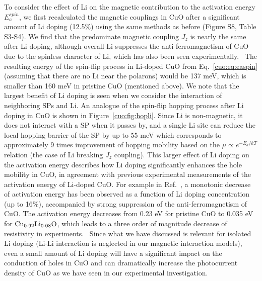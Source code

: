To consider the effect of Li on the magnetic contribution to the activation energy $E_a^{spin}$, we first recalculated the magnetic couplings in CuO after a significant amount of Li doping (12.5\%) using the same methods as before (Figure S8, Table S3-S4). We find that the predominate magnetic coupling $J_z$ is nearly the same after Li doping, although overall Li suppresses the anti-ferromagnetism of CuO due to the spinless character of Li, which has also been seen experimentally.~\cite{zheng2004fast} The resulting energy of the spin-flip process in Li-doped CuO from Eq.~\ref{cuo:eq:easpin} (assuming that there are no Li near the polarons) would be 137 meV, which is smaller than 160 meV in pristine CuO (mentioned above). We note that the largest benefit of Li doping is seen when we consider the interaction of neighboring SPs and Li. An analogue of the spin-flip hopping process after Li doping in CuO is shown in Figure~\ref{cuo:fig:hopli}. Since Li is non-magnetic, it does not interact with a SP when it passes by, and a single Li site can reduce the local hopping barrier of the SP by up to 55 meV which corresponds to approximately 9 times improvement of hopping mobility based on the $\mu \propto e^{-E_a/kT}$ relation (the case of Li breaking $J_z$ coupling). This larger effect of Li doping on the activation energy describes how Li doping significantly enhances the hole mobility in CuO, in agreement with previous experimental measurements of the activation energy of Li-doped CuO.\cite{zheng2004fast,gao2007ferromagnetic,zheng2003effect,chiang2016dopant} For example in Ref.~\cite{zheng2004fast}, a monotonic decrease of activation energy has been observed as a function of Li doping concentration (up to 16\%), accompanied by strong suppression of the anti-ferromagnetism of CuO. The activation energy decreases from 0.23 eV for pristine CuO to 0.035 eV for $\rm Cu_{0.92}Li_{0.08}O$, which leads to a three order of magnitude decrease of resistivity in experiments.~\cite{zheng2004fast} Since what we have discussed is relevant for isolated Li doping (Li-Li interaction is neglected in our magnetic interaction models), even a small amount of Li doping will have a significant impact on the conduction of holes in CuO and can dramatically increase the photocurrent density of CuO as we have seen in our experimental investigation.~\cite{chiang2016dopant}



